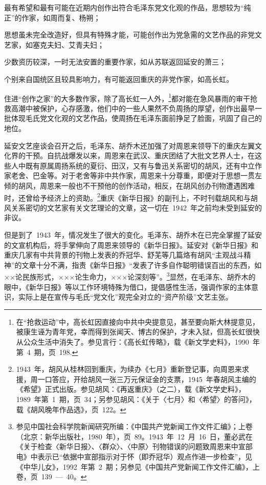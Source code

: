 最有希望和最有可能在近期内创作出符合毛泽东党文化观的作品，思想较为“纯正”的作家，如周而复、杨朔；

思想虽未完全改造好，但具有特殊才能，可能创作出为党急需的文艺作品的非党文艺家，如塞克夫妇、艾青夫妇；

少数资历较深，一时无法安置的重要作家，如从苏联返回延安的萧三；

个别来自国统区且较具影响力，有可能返回重庆的非党作家，如高长虹。

住进“创作之家”的大多数作家，除了高长虹一人外，\footnote{在“抢救运动”中，高长虹因直接向中共中央提意见，甚至要向斯大林提意见，被康生诬为青年党，幸而得到张闻天、博古的保护，才未入狱，但高长虹很快从公众生活中消失了。参见言行：《高长虹传略》，载《新文学史料》，1990~年第~4~期，页~198.}都对能在急风暴雨的审干抢救高潮中被保护，心存感激，他们中的一些人果然不负周扬的厚望，创作出最早一批体现毛氏党文化观的文艺作品，使周扬在毛泽东面前挣足了脸面，巩固了自己的地位。

延安文艺座谈会召开之后，毛泽东、胡乔木还加强了对周恩来领导下的重庆左翼文化界的干预。自抗战爆发以来，周恩来在武汉、重庆团结了大批文艺界人士，在这些人中既有原属周扬系统的夏衍、田汉，又有与鲁迅关系密切的胡风，还有中立作家老舍、巴金等。对于老舍等非中共作家，周恩来十分尊重，即便对于思想一贯左倾的胡风，周恩来一般也不干预他的创作活动，相反，在胡风创办刊物遭遇困难时，还曾给予经济上的资助。\footnote{1943~年，胡风从桂林回到重庆，为续办《七月》重新登记事，向周恩来求援，周一口答应，开给胡风一张三万元保证金的支票，1945~年春胡风主编的《希望》正式出版。参见胡风：《再返重庆》（之二），载《新文学史料》，1989~年第~1~期，页~34；另参见胡风：《关于〈七月〉和〈希望〉的答问》，载《胡风晚年作品选》，页~122。}重庆《新华日报》的副刊上，不时刊载胡风和与胡风关系密切的文艺家有关文艺理论的文章，这一切在~1942~年之前均未受到延安的非议。

但是到了~1943~年，情况发生了很大的变化。毛泽东、胡乔木在已完全掌握了延安的文宣机构后，将手掌伸向了周恩来领导的《新华日报》。延安对《新华日报》和重庆几家有中共背景的刊物上发表的乔冠华、舒芜等几篇烙有胡风“主观战斗精神”的文章十分不满，指责《新华日报》“发表了许多自作聪明错误百出的东西，如××论民族形式，×××论生命力，×××论深刻等”。\footnote{参见中国社会科学院新闻研究所编：《中国共产党新闻工作文件汇编》；上卷（北京：新华出版社，1980~年），页~89。1943~年~12~月~16~日，董必武在《关于检查〈新华日报〉、〈群众〉、〈中原〉刊物错误的问题致周恩来中宣部电》中表示已“依据中宣部指示对于怀（即乔冠华）观点作进一步检查”，见《中华儿女》，1992~年第~2~期；另参见《中国共产党新闻工作文件汇编》，上卷，页~139~—~40。}显然，在毛泽东、胡乔木的眼中，《新华日报》等以工作环境特殊为借口，提倡感性生活，强调作家的主体意识，实际上是在宣传与毛氏“党文化”观完全对立的“资产阶级”文艺主张。


